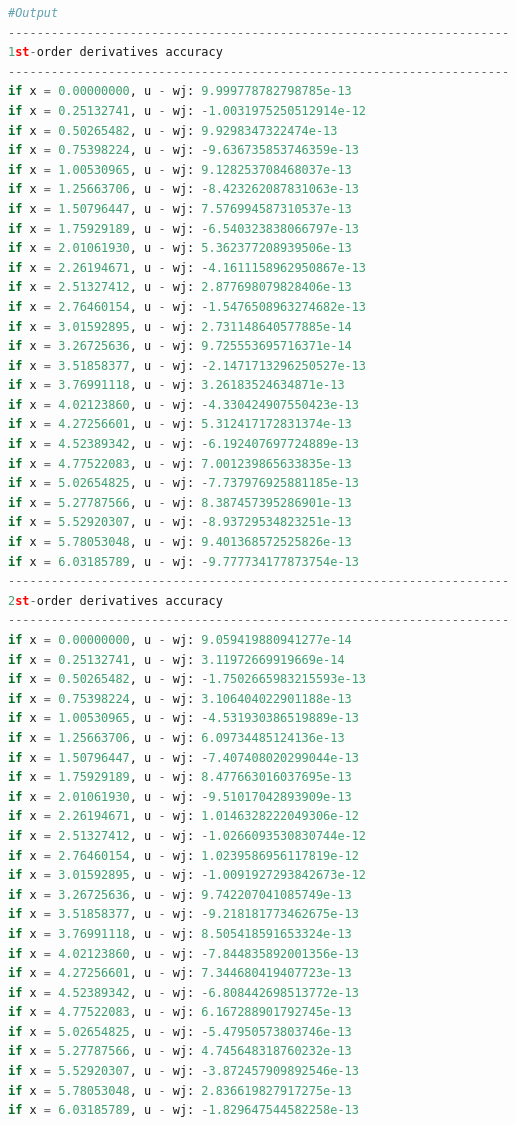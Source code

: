 \documentclass[11pt]{article}
\begin{document}
\begin{lstlisting}[language=Python]
#Output
----------------------------------------------------------------------
1st-order derivatives accuracy
----------------------------------------------------------------------
if x = 0.00000000, u - wj: 9.999778782798785e-13
if x = 0.25132741, u - wj: -1.0031975250512914e-12
if x = 0.50265482, u - wj: 9.9298347322474e-13
if x = 0.75398224, u - wj: -9.636735853746359e-13
if x = 1.00530965, u - wj: 9.128253708468037e-13
if x = 1.25663706, u - wj: -8.423262087831063e-13
if x = 1.50796447, u - wj: 7.576994587310537e-13
if x = 1.75929189, u - wj: -6.540323838066797e-13
if x = 2.01061930, u - wj: 5.362377208939506e-13
if x = 2.26194671, u - wj: -4.1611158962950867e-13
if x = 2.51327412, u - wj: 2.877698079828406e-13
if x = 2.76460154, u - wj: -1.5476508963274682e-13
if x = 3.01592895, u - wj: 2.731148640577885e-14
if x = 3.26725636, u - wj: 9.725553695716371e-14
if x = 3.51858377, u - wj: -2.1471713296250527e-13
if x = 3.76991118, u - wj: 3.26183524634871e-13
if x = 4.02123860, u - wj: -4.330424907550423e-13
if x = 4.27256601, u - wj: 5.312417172831374e-13
if x = 4.52389342, u - wj: -6.192407697724889e-13
if x = 4.77522083, u - wj: 7.001239865633835e-13
if x = 5.02654825, u - wj: -7.737976925881185e-13
if x = 5.27787566, u - wj: 8.387457395286901e-13
if x = 5.52920307, u - wj: -8.93729534823251e-13
if x = 5.78053048, u - wj: 9.401368572525826e-13
if x = 6.03185789, u - wj: -9.777734177873754e-13
----------------------------------------------------------------------
2st-order derivatives accuracy
----------------------------------------------------------------------
if x = 0.00000000, u - wj: 9.059419880941277e-14
if x = 0.25132741, u - wj: 3.11972669919669e-14
if x = 0.50265482, u - wj: -1.7502665983215593e-13
if x = 0.75398224, u - wj: 3.106404022901188e-13
if x = 1.00530965, u - wj: -4.531930386519889e-13
if x = 1.25663706, u - wj: 6.09734485124136e-13
if x = 1.50796447, u - wj: -7.407408020299044e-13
if x = 1.75929189, u - wj: 8.477663016037695e-13
if x = 2.01061930, u - wj: -9.51017042893909e-13
if x = 2.26194671, u - wj: 1.0146328222049306e-12
if x = 2.51327412, u - wj: -1.0266093530830744e-12
if x = 2.76460154, u - wj: 1.0239586956117819e-12
if x = 3.01592895, u - wj: -1.0091927293842673e-12
if x = 3.26725636, u - wj: 9.742207041085749e-13
if x = 3.51858377, u - wj: -9.218181773462675e-13
if x = 3.76991118, u - wj: 8.505418591653324e-13
if x = 4.02123860, u - wj: -7.844835892001356e-13
if x = 4.27256601, u - wj: 7.344680419407723e-13
if x = 4.52389342, u - wj: -6.808442698513772e-13
if x = 4.77522083, u - wj: 6.167288901792745e-13
if x = 5.02654825, u - wj: -5.47950573803746e-13
if x = 5.27787566, u - wj: 4.745648318760232e-13
if x = 5.52920307, u - wj: -3.872457909892546e-13
if x = 5.78053048, u - wj: 2.836619827917275e-13
if x = 6.03185789, u - wj: -1.829647544582258e-13
\end{lstlisting}
\end{document}
